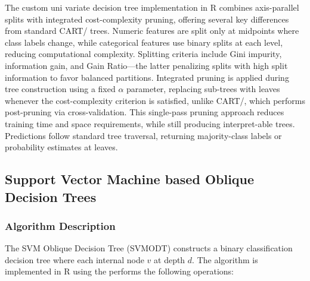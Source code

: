The custom uni variate decision tree implementation in R combines axis-parallel splits with integrated cost-complexity pruning, offering several key differences from standard CART/ trees. Numeric features are split only at midpoints where class labels change, while categorical features use binary splits at each level, reducing computational complexity. Splitting criteria include Gini impurity, information gain, and Gain Ratio---the latter penalizing splits with high split information to favor balanced partitions. Integrated pruning is applied during tree construction using a fixed \(\alpha\) parameter, replacing sub-trees with leaves whenever the cost-complexity criterion is satisfied, unlike CART/, which performs post-pruning via cross-validation. This single-pass pruning approach reduces training time and space requirements, while still producing interpret-able trees. Predictions follow standard tree traversal, returning majority-class labels or probability estimates at leaves.

\subsection{Support Vector Machine based Oblique Decision Trees}\label{support-vector-machine-based-oblique-decision-trees}

\subsubsection{Algorithm Description}\label{algorithm-description-1}

The SVM Oblique Decision Tree (SVMODT) constructs a binary classification decision tree where each internal node \(v\) at depth \(d\). The algorithm is implemented in R using the  performs the following operations:

